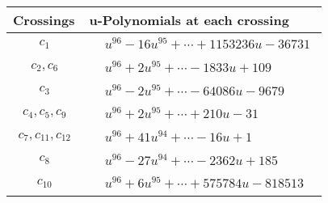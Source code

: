\documentclass[1p]{elsarticle_modified}
\theoremstyle{definition}
\begin{document}
\begin{tabular}{m{50pt}|m{274pt}}
Crossings & \hspace{64pt}u-Polynomials at each crossing \\
\hline $$\begin{aligned}c_{1}\end{aligned}$$&$\begin{aligned}
&u^{96}-16 u^{95}+\cdots+1153236 u-36731
\end{aligned}$\\
\hline $$\begin{aligned}c_{2},c_{6}\end{aligned}$$&$\begin{aligned}
&u^{96}+2 u^{95}+\cdots-1833 u+109
\end{aligned}$\\
\hline $$\begin{aligned}c_{3}\end{aligned}$$&$\begin{aligned}
&u^{96}-2 u^{95}+\cdots-64086 u-9679
\end{aligned}$\\
\hline $$\begin{aligned}c_{4},c_{5},c_{9}\end{aligned}$$&$\begin{aligned}
&u^{96}+2 u^{95}+\cdots+210 u-31
\end{aligned}$\\
\hline $$\begin{aligned}c_{7},c_{11},c_{12}\end{aligned}$$&$\begin{aligned}
&u^{96}+41 u^{94}+\cdots-16 u+1
\end{aligned}$\\
\hline $$\begin{aligned}c_{8}\end{aligned}$$&$\begin{aligned}
&u^{96}-27 u^{94}+\cdots-2362 u+185
\end{aligned}$\\
\hline $$\begin{aligned}c_{10}\end{aligned}$$&$\begin{aligned}
&u^{96}+6 u^{95}+\cdots+575784 u-818513
\end{aligned}$\\
\hline
\end{tabular}\\~\\
\newpage\renewcommand{\arraystretch}{1}
\end{document}
